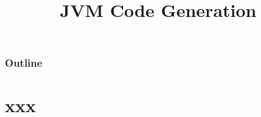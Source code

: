 \documentclass[8pt,a4paper,compress]{beamer}
\title{JVM Code Generation}
\date{}
\begin{document}
\begin{frame}
\vfill
\titlepage
\end{frame}

\begin{frame}
\frametitle{Outline}
\tableofcontents
\end{frame}

\section{xxx}
\begin{frame}[fragile]
\pause


\end{frame}
\end{document}
